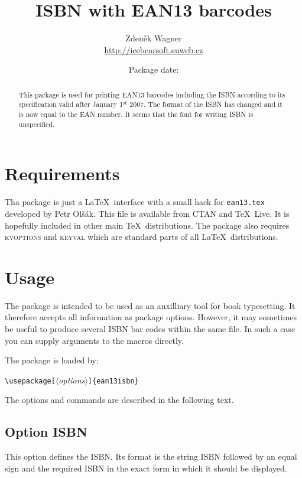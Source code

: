 \documentclass[11pt]{article}
\def\sup#1{\ensuremath{^{\mathrm{#1}}}}
{\lccode`\!`\\
\lowercase{\gdef\Bslash{!}}}
\begin{document}
\title{ISBN with EAN13 barcodes}
\author{Zdeněk Wagner\\\url{http://icebearsoft.euweb.cz}}
\date{Package date: }
\maketitle

\begin{abstract}\noindent
This package is used for printing EAN13 barcodes including the ISBN according to its specification
valid after January 1\sup{st} 2007. The format of the ISBN has changed and it is now equal to the
EAN number. It seems that the font for writing ISBN is unspecified.
\end{abstract}

\tableofcontents

\section{Requirements}
Tha package is just a \LaTeX\ interface with a small hack for \texttt{ean13.tex} developed by Petr
Olšák. This file is available from CTAN and \TeX\ Live. It is hopefully included in other main
\TeX\ distributions. The package also requires \textsc{kvoptions} and \textsc{keyval} which are
standard parts of all \LaTeX\ distributions.

\section{Usage}
The package is intended to be used as an auxilliary tool for book typesetting. It therefore accepts
all information as package options. However, it may sometimes be useful to produce several ISBN bar
codes within the same file. In such a case you can supply arguments to the macros directly.

The package is loaded by:

\medskip
\verb;\usepackage[;$\langle$\textit{options}$\rangle$\verb;]{ean13isbn};

\medskip
The options and commands are described in the following text.

\subsection{Option ISBN}
This option defines the ISBN. Its format is the string ISBN followed by an equal sign and the
required ISBN in the exact form in which it should be displayed.
\end{document}

